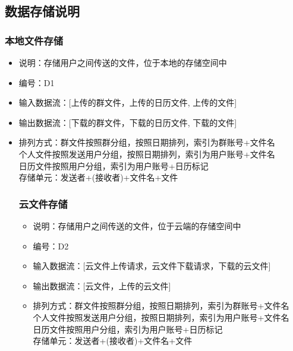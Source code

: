         \subsection{数据存储说明}
            \subsubsection{本地文件存储}
            \begin{itemize}
                \item 说明：存储用户之间传送的文件，位于本地的存储空间中
                \item 编号：D1
                \item 输入数据流：[上传的群文件，上传的日历文件, 上传的文件]
                \item 输出数据流：[下载的群文件，下载的日历文件, 下载的文件]
                \item 排列方式：群文件按照群分组，按照日期排列，索引为群账号+文件名\\
                               个人文件按照发送用户分组，按照日期排列，索引为用户账号+文件名\\
                               日历文件按照用户分组，索引为用户账号+日历标记\\
                               存储单元：发送者+(接收者)+文件名+文件\\
            \subsubsection{云文件存储}
            \begin{itemize}
                \item 说明：存储用户之间传送的文件，位于云端的存储空间中
                \item 编号：D2
                \item 输入数据流：[云文件上传请求，云文件下载请求，下载的云文件]
                \item 输出数据流：[云文件，上传的云文件]
                \item 排列方式：群文件按照群分组，按照日期排列，索引为群账号+文件名\\
                               个人文件按照发送用户分组，按照日期排列，索引为用户账号+文件名\\
                               日历文件按照用户分组，索引为用户账号+日历标记\\
                               存储单元：发送者+(接收者)+文件名+文件\\
            \end{itemize}

\end{itemize}
